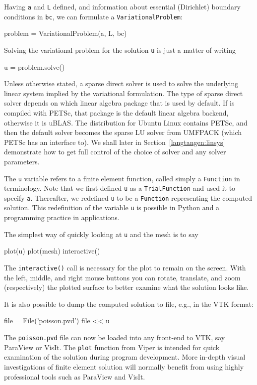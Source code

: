 Having {\fontsize{10pt}{10pt}\verb!a!} and {\fontsize{10pt}{10pt}\verb!L!} defined, and information about essential
(Dirichlet) boundary conditions in {\fontsize{10pt}{10pt}\verb!bc!}, we can formulate a 
{\fontsize{10pt}{10pt}\verb!VariationalProblem!}:
\begin{python}
problem = VariationalProblem(a, L, bc)
\end{python}
Solving the variational problem for the solution {\fontsize{10pt}{10pt}\verb!u!} is just a
matter of writing
\begin{python}
u = problem.solve()
\end{python}
Unless otherwise stated, a sparse direct solver is used to solve the underlying
linear system implied by the variational formulation. The type
of sparse direct solver depends on which linear algebra package
that is used by default. If \dolfin{} is compiled with PETSc, that package
is the default linear algebra backend, otherwise it is uBLAS.
The \fenics{} distribution for Ubuntu Linux contains PETSc, and then
the default solver becomes the sparse LU solver from UMFPACK (which
PETSc has an interface to). We shall later in Section~\ref{langtangen:linsys}
demonstrate how to get
full control of the choice of solver and any solver parameters.

The {\fontsize{10pt}{10pt}\verb!u!} variable refers to a finite element function, called simply
a {\fontsize{10pt}{10pt}\verb!Function!} in \fenics{} terminology. 
Note that we first defined {\fontsize{10pt}{10pt}\texttt{u}} as
a {\fontsize{10pt}{10pt}\texttt{TrialFunction}} and used it to specify {\fontsize{10pt}{10pt}\texttt{a}}.
Thereafter, we redefined {\fontsize{10pt}{10pt}\texttt{u}} to be a {\fontsize{10pt}{10pt}\texttt{Function}} representing
the computed solution. This redefinition of the variable {\fontsize{10pt}{10pt}\texttt{u}}
is possible in Python and a programming practice in \fenics{}
applications.

The simplest way of quickly looking at {\fontsize{10pt}{10pt}\texttt{u}} and the mesh
is to say
\begin{python}
plot(u)
plot(mesh)
interactive()
\end{python}
The {\fontsize{10pt}{10pt}\verb!interactive()!} call is necessary for the plot to remain on the
screen. With the left, middle, and right 
mouse buttons you can rotate, translate, and zoom
(respectively) the plotted surface to better examine what the solution looks
like.

It is also possible to dump the computed solution to file, e.g., in the
VTK format:
\begin{python}
file = File('poisson.pvd')
file << u
\end{python}
The {\fontsize{10pt}{10pt}\verb!poisson.pvd!} file can now be loaded into any 
front-end to VTK, say ParaView or VisIt. The {\fontsize{10pt}{10pt}\texttt{plot}} function from Viper
is intended for quick examination of the solution during program development.
More in-depth visual investigations of finite element solution will
normally benefit from using highly professional tools such as ParaView and
VisIt.



